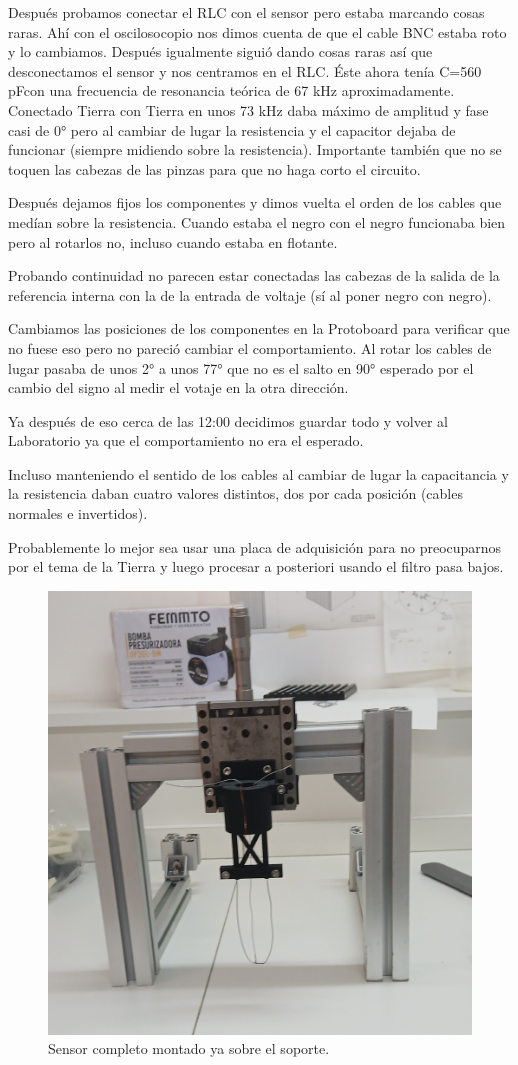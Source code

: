 Después probamos conectar el RLC con el sensor pero estaba marcando cosas raras. Ahí con el oscilosocopio nos dimos cuenta de que el cable BNC estaba roto y lo cambiamos. Después igualmente siguió dando cosas raras así que desconectamos el sensor y nos centramos en el RLC. Éste ahora tenía C=560 pFcon una frecuencia de resonancia teórica de 67 kHz aproximadamente. Conectado Tierra con Tierra en unos 73 kHz daba máximo de amplitud y fase casi de 0° pero al cambiar de lugar la resistencia y el capacitor dejaba de funcionar (siempre midiendo sobre la resistencia).  Importante también que no se toquen las cabezas de las pinzas para que no haga corto el circuito. %

Después dejamos fijos los componentes y dimos vuelta el orden de los cables que medían sobre la resistencia. Cuando estaba el negro con el negro funcionaba bien pero al rotarlos no, incluso cuando estaba en flotante. 

Probando continuidad no parecen estar conectadas las cabezas de la salida de la referencia interna con la de la entrada de voltaje (sí al poner negro con negro). 

Cambiamos las posiciones de los componentes en la Protoboard para verificar que no fuese eso pero no pareció cambiar el comportamiento. Al rotar los cables de lugar pasaba de unos 2° a unos 77° que no es el salto en 90° esperado por el cambio del signo al medir el votaje en la otra dirección. %

Ya después de eso cerca de las 12:00 decidimos guardar todo y volver al Laboratorio ya que el comportamiento no era el esperado. 

Incluso manteniendo el sentido de los cables al cambiar de lugar la capacitancia y la resistencia daban cuatro valores distintos, dos por cada posición (cables normales e invertidos). 

Probablemente lo mejor sea usar una placa de adquisición para no preocuparnos por el tema de la Tierra y luego procesar a posteriori usando el filtro pasa bajos. 

\begin{figure}[!ht]
	\centering
	\includegraphics[width=0.7\linewidth]{Figures/12_05_2025/20250512_140434.JPG}
	\caption{Sensor completo montado ya sobre el soporte.}
	\label{fig:foto_sensor_completo_12_05_2025}
\end{figure}

